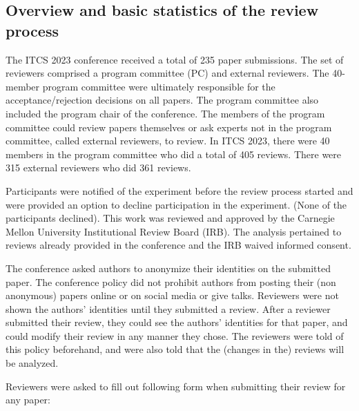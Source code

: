 \documentclass{article}
\begin{document}
\subsection{Overview and basic statistics of the review process}
\label{SecBasicReview}

The ITCS 2023 conference received a total of 235 paper submissions. 
The set of reviewers comprised a program committee (PC) and external reviewers. The 40-member program committee were ultimately responsible for the acceptance/rejection decisions on all papers.  The program committee also included the program chair of the conference. The members of the program committee could review papers themselves or ask experts not in the program committee, called external reviewers, to review. In ITCS 2023, there were 40 members in the program committee who did a total of 405 reviews. There were 315 external reviewers who did 361 reviews. 

Participants were notified of the experiment before the review process started and were provided an option to decline participation in the experiment. (None of the participants declined). This work was reviewed and approved by the Carnegie Mellon University Institutional Review Board (IRB). The analysis pertained to reviews already provided in the conference and the IRB waived informed consent.


The conference asked authors to anonymize their identities on the submitted paper. The conference policy did not prohibit authors from posting their (non anonymous) papers online or on social media or give talks. Reviewers were not shown the authors' identities until they submitted a review. After a reviewer submitted their review, they could see the authors' identities for that paper, and could modify their review in any manner they chose. The reviewers were told of this policy beforehand, and were also told that the (changes in the) reviews will be analyzed.  

Reviewers were asked to fill out following form when submitting their review for any paper:
\end{document}
